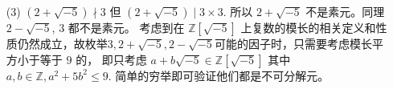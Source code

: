 \documentclass{article}
\begin{document}
\begin{enumerate}
\begin{spacing}{1.5}
\begin{enumerate}
        \textbf{命题 2} 欧几里得整环都是主理想整环。
        \begin{proof}
            设 $I$ 是一欧几里得整环 $R$ 上的理想，设 $\phi : R\to \mathbb{N}$ 是定义在这一欧几里得环上的度量。可以从 $I$ 中选取出度量最小的元素 $a \in I$. 
            对于任意的 $b\in I$, 由于在欧几里得环上存在 $q, r\in R$ 使得 $b = q\cdot a + r$, 其中 $r=0$ 或者 $\phi(r) < \phi(a)$. 显然 $r = b - q\cdot a\in I$,
            所以 $\phi(r) < \phi(a)$ 不能成立，因此 $r=0$。 这就说明了 $I\subset (a)\subset I$, 即 $I = (a)$ 是可由 $a$ 生成的主理想。
        \end{proof}

        由命题1、2知，只需要验证 $R\in\{\mathbb{Z}, \mathbb{F}[x], \mathbb{Z}[i]\}$ 是欧几里得环。其中 $\mathbb{Z}, \mathbb{F}[x]$ 是十分常见的欧几里得环，这里略去验证，只
        验证 $\mathbb{Z}[i]$ 是欧几里得环：
        \begin{proof}
            定义度量 $\phi: \mathbb{Z}[i] \to \mathbb{N}$， $\phi(a) = |a|^2 = a\cdot \bar{a}$ .
            对于任意非零的 $a, b\in\mathbb{Z}[i]\subset \mathbb{Q}[i]$, $\dfrac{a}{b} = \dfrac{a\bar{b}}{b\bar{b}} = x + yi$, 其中 $x, y \in\mathbb{Q}$. 取距离 $x$, $y$ 
            最近的整数 $m$, $n$, 有  $|m - x| \leq 0.5, |n - y| \leq 0.5$. 构造 $q = m + ni \in\mathbb{Z}[i]$, $r = a - qb \in\mathbb{Z}[i]$, 使得 $a = qb + r$, 且其中 $r=0$ 
            或者 $\phi(r) = \phi(((x - m) + (y - n)i)\cdot b) = \phi((x - m) + (y - n) i)\cdot\phi(b) \leq 0.5 \cdot \phi(b) < \phi(b)$. 
        \end{proof}

        \item [(3)] $(2 + \sqrt {-5}) \nmid 3$ 但 $(2 + \sqrt{-5}) \mid 3 \times 3$. 所以 $2 +\sqrt{-5}$ 不是素元。同理 $2-\sqrt{-5}$, $3$ 都不是素元。
        考虑到在 $\mathbb{Z}[\sqrt{-5}]$ 上复数的模长的相关定义和性质仍然成立，故枚举$3, 2 + \sqrt{-5}, 2-\sqrt{-5}$可能的因子时，只需要考虑模长平方小于等于 $9$ 的，
        即只考虑 $a + b\sqrt{-5} \in\mathbb{Z}[\sqrt{-5}]$ 其中 $a,b \in \mathbb{Z}, a^2 + 5b^2 \leq 9$. 简单的穷举即可验证他们都是不可分解元。

    \end{enumerate}
    \end{spacing}

\end{enumerate}
\end{document}
